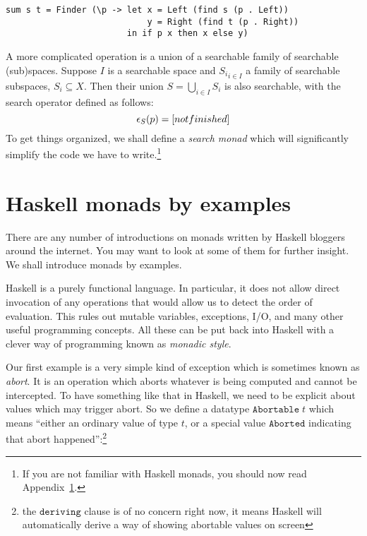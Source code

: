 \documentclass[a4paper,10pt]{article}
\begin{document}
% 
\begin{lstlisting}
sum s t = Finder (\p -> let x = Left (find s (p . Left))
                            y = Right (find t (p . Right))
                        in if p x then x else y)
\end{lstlisting}
% 
A more complicated operation is a union of a searchable family of
searchable (sub)spaces. Suppose $I$ is a searchable space and
${S_i}_{i \in I}$ a family of searchable subspaces, $S_i \subseteq X$.
Then their union $S = \bigcup_{i \in I} S_i$ is also searchable, with
the search operator defined as follows:
%
\begin{equation*}
  \epsilon_S(p) = \text[not finished]
\end{equation*}
%
To get things organized, we shall define a \emph{search monad} which
will significantly simplify the code we have to write.\footnote{If you
  are not familiar with Haskell monads, you should now read
  Appendix~\ref{app:monads}.}






\appendix
    
\section{Haskell monads by examples} %
\label{app:monads}

There are any number of introductions on monads written by Haskell bloggers
around the internet. You may want to look at some of them for further insight.
We shall introduce monads by examples.

Haskell is a purely functional language. In particular, it does not allow
direct invocation of any operations that would allow us to detect the order of
evaluation. This rules out mutable variables, exceptions, I/O, and many other
useful programming concepts. All these can be put back into Haskell with a
clever way of programming known as \emph{monadic style}.

Our first example is a very simple kind of exception which is sometimes known
as \emph{abort}. It is an operation which aborts whatever is being computed
and cannot be intercepted. To have something like that in Haskell, we need to
be explicit about values which may trigger abort. So we define a datatype
$\mathtt{Abortable}\;t$ which means ``either an ordinary value of type $t$, or
a special value $\mathtt{Aborted}$ indicating that abort
happened'':\footnote{the $\mathtt{deriving}$ clause is of no concern right
  now, it means Haskell will automatically derive a way of showing abortable
  values on screen}
\end{document}
